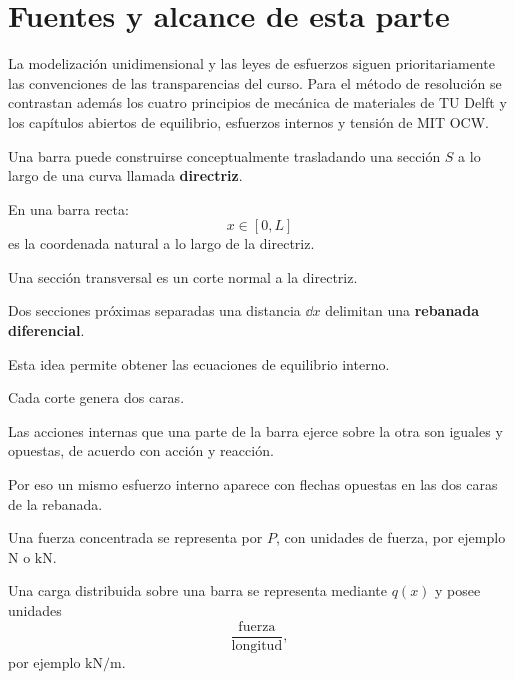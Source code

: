 \chapter*{Fuentes y alcance de esta parte}
La modelización unidimensional y las leyes de esfuerzos siguen prioritariamente las convenciones de las transparencias del curso. Para el método de resolución se contrastan además los cuatro principios de mecánica de materiales de TU Delft y los capítulos abiertos de equilibrio, esfuerzos internos y tensión de MIT OCW.\autocite{lanza-temas12b,tudelft-four-principles,bucciarelli2002}



Una barra puede construirse conceptualmente trasladando una sección $S$ a lo largo de una curva llamada \textbf{directriz}.

En una barra recta:
\[
x\in[0,L]
\]
es la coordenada natural a lo largo de la directriz.

Una sección transversal es un corte normal a la directriz.

Dos secciones próximas separadas una distancia $\dd x$ delimitan una \textbf{rebanada diferencial}.


Esta idea permite obtener las ecuaciones de equilibrio interno.

Cada corte genera dos caras.

Las acciones internas que una parte de la barra ejerce sobre la otra son iguales y opuestas, de acuerdo con acción y reacción.

Por eso un mismo esfuerzo interno aparece con flechas opuestas en las dos caras de la rebanada.


Una fuerza concentrada se representa por $P$, con unidades de fuerza, por ejemplo $\mathrm{N}$ o $\mathrm{kN}$.

Una carga distribuida sobre una barra se representa mediante $q(x)$ y posee unidades
\[
\frac{\mathrm{fuerza}}{\mathrm{longitud}},
\]
por ejemplo $\mathrm{kN/m}$.

